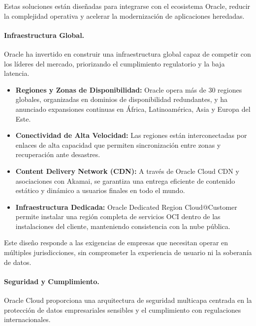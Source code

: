 {                Estas soluciones están diseñadas para integrarse con el ecosistema Oracle, reducir la complejidad operativa y acelerar la modernización de aplicaciones heredadas.
                
                \paragraph{Infraestructura Global.}                
                Oracle ha invertido en construir una infraestructura global capaz de competir con los líderes del mercado, priorizando el cumplimiento regulatorio y la baja latencia.
                
                \begin{itemize}
                    \item \textbf{Regiones y Zonas de Disponibilidad:} Oracle opera más de 30 regiones globales, organizadas en dominios de disponibilidad redundantes, y ha anunciado expansiones continuas en África, Latinoamérica, Asia y Europa del Este.
                    \item \textbf{Conectividad de Alta Velocidad:} Las regiones están interconectadas por enlaces de alta capacidad que permiten sincronización entre zonas y recuperación ante desastres.
                    \item \textbf{Content Delivery Network (CDN):} A través de Oracle Cloud CDN y asociaciones con Akamai, se garantiza una entrega eficiente de contenido estático y dinámico a usuarios finales en todo el mundo.
                    \item \textbf{Infraestructura Dedicada:} Oracle Dedicated Region Cloud@Customer permite instalar una región completa de servicios OCI dentro de las instalaciones del cliente, manteniendo consistencia con la nube pública.
                \end{itemize}
                
                Este diseño responde a las exigencias de empresas que necesitan operar en múltiples jurisdicciones, sin comprometer la experiencia de usuario ni la soberanía de datos.
                
                \paragraph{Seguridad y Cumplimiento.}                
                Oracle Cloud proporciona una arquitectura de seguridad multicapa centrada en la protección de datos empresariales sensibles y el cumplimiento con regulaciones internacionales.
                
}

